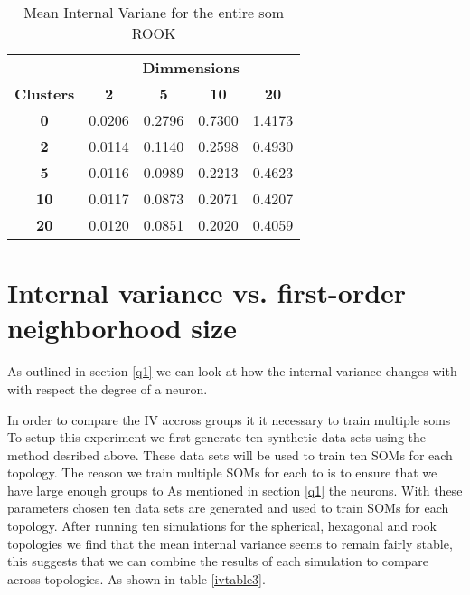 \begin{table}
\centering
\caption{Mean Internal Variane for the entire som ROOK}
\label{ivtable2}
\begin{tabular}{|c||c|c|c|c|}
\hline
&\multicolumn{4}{c|}{\textbf{Dimmensions}}\\
\textbf{Clusters} & \multicolumn{1}{c}{\textbf{2}} &
\multicolumn{1}{c}{\textbf{5}} & \multicolumn{1}{c}{\textbf{10}} &
\multicolumn{1}{c|}{\textbf{20}}\\
\hline
\hline
\textbf{0} & 0.0206& 0.2796& 0.7300& 1.4173 \\
\hline
\textbf{2} & 0.0114& 0.1140& 0.2598& 0.4930 \\
\hline
\textbf{5} & 0.0116& 0.0989& 0.2213& 0.4623 \\
\hline
\textbf{10} & 0.0117& 0.0873& 0.2071& 0.4207 \\
\hline
\textbf{20} & 0.0120& 0.0851& 0.2020& 0.4059 \\
\hline
\end{tabular} \end{table}


\section{Internal variance vs. first-order neighborhood size}
As outlined in section \ref{q1} we can look at how the internal variance
changes with with respect the degree of a neuron.  

In order to compare the IV accross groups it it necessary to train multiple
soms 
To setup this experiment we
first generate ten synthetic data sets using the method desribed above.  These
data sets will be used to train ten SOMs for each topology.  The reason we
train multiple SOMs for each to is to ensure that we have large enough groups to 
As mentioned in section \ref{q1} the neurons.
With these parameters chosen ten data sets are generated and used to train
SOMs for each topology.  After running ten simulations for the spherical,
hexagonal and rook topologies we find that the mean internal variance seems to
remain fairly stable, this suggests that we can combine the results of each
simulation to compare across topologies. As shown in table \ref{ivtable3}.

